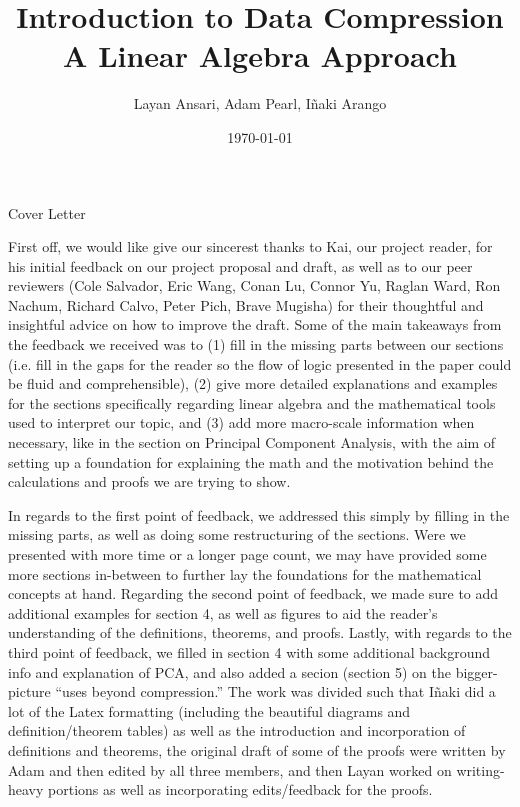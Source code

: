 \documentclass[12pt]{report}
\title{%
    \huge{Introduction to Data Compression} \\
    \large{\large{A Linear Algebra Approach}}
}
\author{\large{Layan Ansari, Adam Pearl, Iñaki Arango}}
\date{\today}
\begin{document}
    \maketitle
    
    
    \newpage%
    
    \vspace*{1cm}
    \centerline{\huge\huge Cover Letter}
    \vspace*{1cm}
    
    First off, we would like give our sincerest thanks to Kai, our project reader, for his initial feedback on our project proposal and draft, as well as to our peer reviewers (Cole Salvador, Eric Wang, Conan Lu, Connor Yu, Raglan Ward, Ron Nachum, Richard Calvo, Peter Pich, Brave Mugisha) for their thoughtful and insightful advice on how to improve the draft. Some of the main takeaways from the feedback we received was to (1) fill in the missing parts between our sections (i.e. fill in the gaps for the reader so the flow of logic presented in the paper could be fluid and comprehensible), (2) give more detailed explanations and examples for the sections specifically regarding linear algebra and the mathematical tools used to interpret our topic, and (3) add more macro-scale information when necessary, like in the section on Principal Component Analysis, with the aim of setting up a foundation for explaining the math and the motivation behind the calculations and proofs we are trying to show.
    
    In regards to the first point of feedback, we addressed this simply by filling in the missing parts, as well as doing some restructuring of the sections. Were we presented with more time or a longer page count, we may have provided some more sections in-between to further lay the foundations for the mathematical concepts at hand. Regarding the second point of feedback, we made sure to add additional examples for section 4, as well as figures to aid the reader's understanding of the definitions, theorems, and proofs. Lastly, with regards to the third point of feedback, we filled in section 4 with some additional background info and explanation of PCA, and also added a secion (section 5) on the bigger-picture ``uses beyond compression.'' The work was divided such that Iñaki did a lot of the Latex formatting (including the beautiful diagrams and definition/theorem tables) as well as the introduction and incorporation of definitions and theorems, the original draft of some of the proofs were written by Adam and then edited by all three members, and then Layan worked on writing-heavy portions as well as incorporating edits/feedback for the proofs.  
\end{document}
